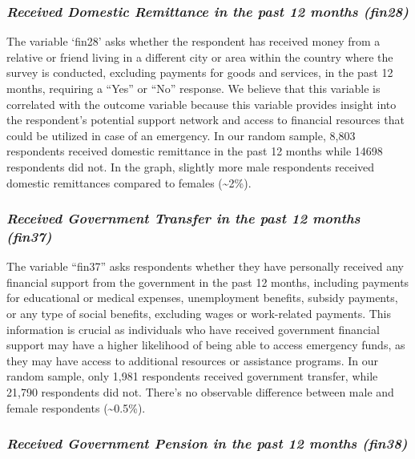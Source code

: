 \documentclass[12pt]{article}
\begin{document}
\hypertarget{received-domestic-remittance-in-the-past-12-months-fin28}{%
\subsubsection{\texorpdfstring{\emph{Received Domestic Remittance in the
past 12 months
(fin28)}}{Received Domestic Remittance in the past 12 months (fin28)}}\label{received-domestic-remittance-in-the-past-12-months-fin28}}

The variable `fin28' asks whether the respondent has received money from
a relative or friend living in a different city or area within the
country where the survey is conducted, excluding payments for goods and
services, in the past 12 months, requiring a ``Yes'' or ``No'' response.
We believe that this variable is correlated with the outcome variable
because this variable provides insight into the respondent's potential
support network and access to financial resources that could be utilized
in case of an emergency. In our random sample, 8,803 respondents
received domestic remittance in the past 12 months while 14698
respondents did not. In the graph, slightly more male respondents
received domestic remittances compared to females (\textasciitilde2\%).

\hypertarget{received-government-transfer-in-the-past-12-months-fin37}{%
\subsubsection{\texorpdfstring{\emph{Received Government Transfer in the
past 12 months
(fin37)}}{Received Government Transfer in the past 12 months (fin37)}}\label{received-government-transfer-in-the-past-12-months-fin37}}

The variable ``fin37'' asks respondents whether they have personally
received any financial support from the government in the past 12
months, including payments for educational or medical expenses,
unemployment benefits, subsidy payments, or any type of social benefits,
excluding wages or work-related payments. This information is crucial as
individuals who have received government financial support may have a
higher likelihood of being able to access emergency funds, as they may
have access to additional resources or assistance programs. In our
random sample, only 1,981 respondents received government transfer,
while 21,790 respondents did not. There's no observable difference
between male and female respondents (\textasciitilde0.5\%).

\hypertarget{received-government-pension-in-the-past-12-months-fin38}{%
\subsubsection{\texorpdfstring{\emph{Received Government Pension in the
past 12 months
(fin38)}}{Received Government Pension in the past 12 months (fin38)}}\label{received-government-pension-in-the-past-12-months-fin38}}
\end{document}
